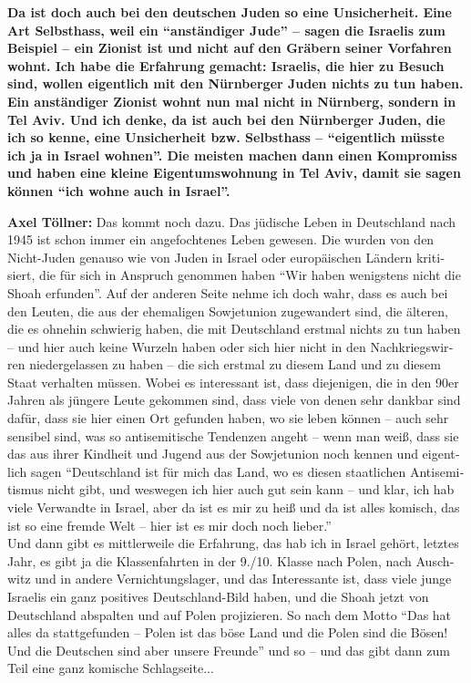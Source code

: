 \begin{otherlanguage}{ngerman}
\textbf{Da ist doch auch bei den deutschen Juden so eine Unsicherheit. Eine Art Selbsthass, weil ein "`anständiger Jude"' – sagen die Israelis zum Beispiel – ein Zionist ist und nicht auf den Gräbern seiner Vorfahren wohnt. Ich habe die Erfahrung gemacht: Israelis, die hier zu Besuch sind, wollen eigentlich mit den Nürnberger Juden nichts zu tun haben. Ein anständiger Zionist wohnt nun mal nicht in Nürnberg, sondern in Tel Aviv. Und ich denke, da ist auch bei den Nürnberger Juden, die ich so kenne, eine Unsicherheit bzw. Selbsthass – "`eigentlich müsste ich ja in Israel wohnen"'. Die meisten machen dann einen Kompromiss und haben eine kleine Eigentumswohnung in Tel Aviv, damit sie sagen können "`ich wohne auch in Israel"'.}  

\textbf{Axel Töllner:} Das kommt noch dazu. Das jüdische Leben in Deutschland nach 1945 ist schon immer ein angefochtenes Leben gewesen. Die wurden von den Nicht-Juden genauso wie von Juden in Israel oder europäischen Ländern kritisiert, die für sich in Anspruch genommen haben "`Wir haben wenigstens nicht die Shoah erfunden"'. Auf der anderen Seite nehme ich doch wahr, dass es auch bei den Leuten, die aus der ehemaligen Sowjetunion zugewandert sind, die älteren, die es ohnehin schwierig haben, die mit Deutschland erstmal nichts zu tun haben – und hier auch keine Wurzeln haben oder sich hier nicht in den Nachkriegswirren niedergelassen zu haben – die sich erstmal zu diesem Land und zu diesem Staat verhalten müssen. Wobei es interessant ist, dass diejenigen, die in den 90er Jahren als jüngere Leute gekommen sind, dass viele von denen sehr dankbar sind dafür, dass sie hier einen Ort gefunden haben, wo sie leben können – auch sehr sensibel sind, was so antisemitische Tendenzen angeht – wenn man weiß, dass sie das aus ihrer Kindheit und Jugend aus der Sowjetunion noch kennen und eigentlich sagen "`Deutschland ist für mich das Land, wo es diesen staatlichen Antisemitismus nicht gibt, und weswegen ich hier auch gut sein kann – und klar, ich hab viele Verwandte in Israel, aber da ist es mir zu heiß und da ist alles komisch, das ist so eine fremde Welt – hier ist es mir doch noch lieber."' \\ 
Und dann gibt es mittlerweile die Erfahrung, das hab ich in Israel gehört, letztes Jahr, es gibt ja die Klassenfahrten in der 9./10. Klasse nach Polen, nach Auschwitz und in andere Vernichtungslager, und das Interessante ist, dass viele junge Israelis ein ganz positives Deutschland-Bild haben, und die Shoah jetzt von Deutschland abspalten und auf Polen projizieren. So nach dem Motto "`Das hat alles da stattgefunden – Polen ist das böse Land und die Polen sind die Bösen! Und die Deutschen sind aber unsere Freunde"' und so – und das gibt dann zum Teil eine ganz komische Schlagseite... 


\end{otherlanguage}

